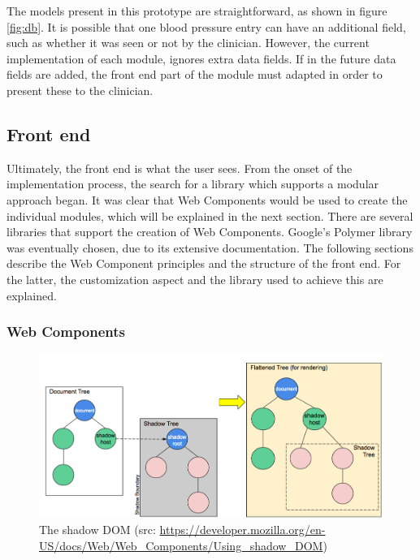         

        The models present in this prototype are straightforward, as shown in figure \ref{fig:db}. It is possible that one blood pressure entry can have an additional field, such as whether it was seen or not by the clinician. However, the current implementation of each module, ignores extra data fields. If in the future data fields are added, the front end part of the module must adapted in order to present these to the clinician.

    \subsection{Front end}

    Ultimately, the front end is what the user sees. From the onset of the implementation process, the search for a library which supports a modular approach began. It was clear that Web Components would be used to create the individual modules, which will be explained in the next section. There are several libraries that support the creation of Web Components. Google's Polymer library was eventually chosen, due to its extensive documentation. The following sections describe the Web Component principles and the structure of the front end. For the latter, the customization aspect and the library used to achieve this are explained.

        \subsubsection{Web Components}
        
        \begin{figure}[!t]
            \centering
            \includegraphics[width=1.0\textwidth]{chapters/4_implementation/shadow-dom}
            \caption{The shadow DOM (src: \url{https://developer.mozilla.org/en-US/docs/Web/Web_Components/Using_shadow_DOM})}\label{fig:shadow_dom}
        \end{figure}

